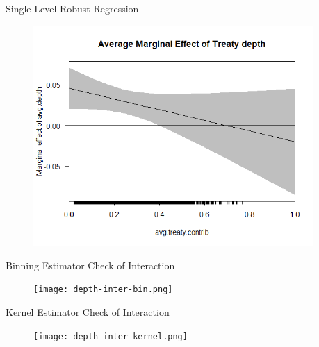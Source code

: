 \documentclass[12pt]{beamer}
\begin{document}


\begin{frame}{Single-Level Robust Regression}

\begin{figure}[htbp]
	\centering
		\includegraphics[width=0.95\textwidth]{depth-contrib-margins.png}
\end{figure}



\end{frame}



\begin{frame}{Binning Estimator Check of Interaction}

\begin{figure}[htbp]
	\centering
		\texttt{[image: depth-inter-bin.png]}
\end{figure}


\end{frame}




\begin{frame}{Kernel Estimator Check of Interaction}

\begin{figure}[htbp]
	\centering
		\texttt{[image: depth-inter-kernel.png]}
\end{figure}


\end{frame}




\end{document}
